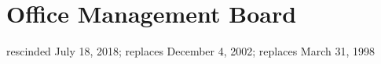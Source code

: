 \section{Office Management Board}
rescinded July 18, 2018; replaces December 4, 2002; replaces March 31, 1998
